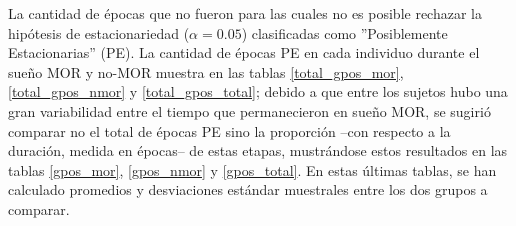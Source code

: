 La cantidad de \'epocas que no fueron para las cuales no es posible rechazar la hip\'otesis de
estacionariedad ($\alpha=0.05$)
clasificadas como ''Posiblemente Estacionarias'' (PE). 
La cantidad de \'epocas PE en cada individuo %
durante el sue\~no MOR y no-MOR
muestra en las tablas \ref{total_gpos_mor}, \ref{total_gpos_nmor} y
\ref{total_gpos_total}; debido a que entre los sujetos hubo una gran variabilidad entre el tiempo 
que permanecieron en sue\~no MOR, se sugiri\'o comparar no el total de \'epocas PE sino
la proporci\'on --con respecto a la duraci\'on, medida en \'epocas-- de estas etapas, 
mustr\'andose estos resultados en las tablas \ref{gpos_mor}, \ref{gpos_nmor} y
\ref{gpos_total}. En estas \'ultimas tablas, se han calculado promedios y desviaciones
est\'andar muestrales entre los dos grupos a comparar.



